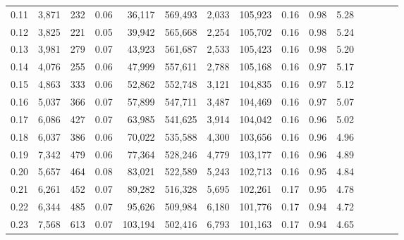 \begin{tabular}{rrrcrrrrrrrrrrr}
0.11 &   3,871 &    232 &                                       0.06 &   36,117 &  569,493 &    2,033 &  105,923 &  0.16 &  0.98 &                         5.28 \\
0.12 &   3,825 &    221 &                                       0.05 &   39,942 &  565,668 &    2,254 &  105,702 &  0.16 &  0.98 &                         5.24 \\
0.13 &   3,981 &    279 &                                       0.07 &   43,923 &  561,687 &    2,533 &  105,423 &  0.16 &  0.98 &                         5.20 \\
0.14 &   4,076 &    255 &                                       0.06 &   47,999 &  557,611 &    2,788 &  105,168 &  0.16 &  0.97 &                         5.17 \\
0.15 &   4,863 &    333 &                                       0.06 &   52,862 &  552,748 &    3,121 &  104,835 &  0.16 &  0.97 &                         5.12 \\
0.16 &   5,037 &    366 &                                       0.07 &   57,899 &  547,711 &    3,487 &  104,469 &  0.16 &  0.97 &                         5.07 \\
0.17 &   6,086 &    427 &                                       0.07 &   63,985 &  541,625 &    3,914 &  104,042 &  0.16 &  0.96 &                         5.02 \\
0.18 &   6,037 &    386 &                                       0.06 &   70,022 &  535,588 &    4,300 &  103,656 &  0.16 &  0.96 &                         4.96 \\
0.19 &   7,342 &    479 &                                       0.06 &   77,364 &  528,246 &    4,779 &  103,177 &  0.16 &  0.96 &                         4.89 \\
0.20 &   5,657 &    464 &                                       0.08 &   83,021 &  522,589 &    5,243 &  102,713 &  0.16 &  0.95 &                         4.84 \\
0.21 &   6,261 &    452 &                                       0.07 &   89,282 &  516,328 &    5,695 &  102,261 &  0.17 &  0.95 &                         4.78 \\
0.22 &   6,344 &    485 &                                       0.07 &   95,626 &  509,984 &    6,180 &  101,776 &  0.17 &  0.94 &                         4.72 \\
0.23 &   7,568 &    613 &                                       0.07 &  103,194 &  502,416 &    6,793 &  101,163 &  0.17 &  0.94 &                         4.65 \\

\end{tabular}
